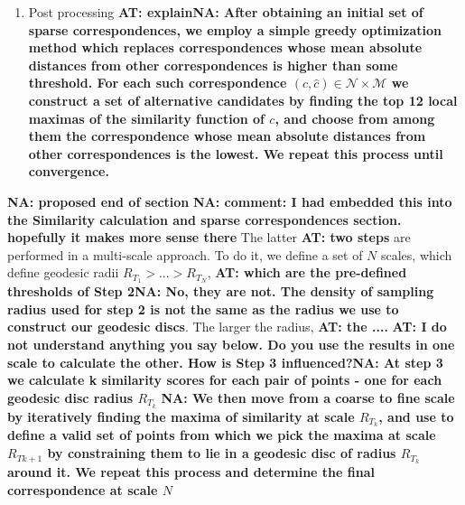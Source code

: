 \documentclass[10pt,twocolumn,letterpaper]{article}
\newcommand{\colornote}[3]{{\color{#1}\bf{#2: #3}\normalfont}}
\newcommand{\colornote}[3]{}
\newcommand {\ayellet}[1]{\colornote{blue}{AT}{#1}}
\newcommand {\nadav}[1]{\colornote{red}{NA}{#1}}
\begin{document}
\begin{enumerate}
    \item{Post processing}
    \ayellet{explain}\nadav{After obtaining an initial set of sparse correspondences, we employ a simple greedy optimization method which replaces correspondences whose mean absolute distances from other correspondences is higher than some threshold. For each such correspondence $(c,\hat{c})\in\mathcal{N}\times\mathcal{M}$ we construct a set of alternative candidates by finding the top 12 local maximas of the similarity function of $c$, and choose from among them the correspondence whose mean absolute distances from other correspondences is the lowest. We repeat this process until convergence.}
    
\end{enumerate}

\nadav{proposed end of section}
\nadav{comment: I had embedded this into the Similarity calculation and sparse correspondences section. hopefully it makes more sense there}
The latter \ayellet{two steps} are performed in a multi-scale approach. 
To do it, we define a set of $N$ scales, which define geodesic radii $R_{T_1}>...>R_{T_N}$, \ayellet{which are the pre-defined thresholds of Step 2}\nadav{No, they are not. The density of sampling radius used for step 2 is not the same as the radius we use to construct our geodesic discs}.
The larger the radius, \ayellet{the ....}
\ayellet{ I do not understand anything you say below. Do you use the results in one scale to calculate the other. How is Step 3 influenced?}\nadav{At step 3 we calculate k similarity scores for each pair of points - one for each geodesic disc radius $R_{T_k}$}
\nadav{We then move from a coarse to fine scale by iteratively finding the maxima of similarity at scale $R_{T_k}$, and use to define a valid set of points from which we pick the maxima at scale $R_{T{k+1}}$ by constraining them to lie in a geodesic disc of radius $R_{T_k}$ around it. We repeat this process and determine the final correspondence at scale $N$}

\end{document}
